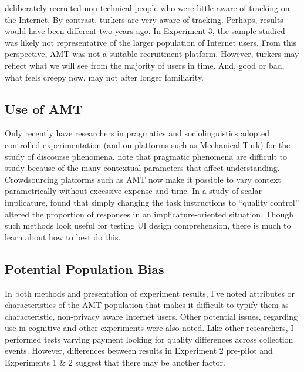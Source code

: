  \citet{Ur:2012ws}  deliberately recruited non-technical people who were little aware of tracking on the Internet. By contrast, turkers are very aware of tracking. Perhaps, results would have been different two years ago. In Experiment 3, the sample studied was likely not representative of the larger population of Internet users. From this perspective, AMT was not a suitable recruitment platform. However, turkers may reflect what we will see from the majority of users in time. And, good or bad, what feels creepy now, may not after longer familiarity.

\subsection{Use of AMT}
\label{useofamt}

Only recently have researchers in pragmatics and sociolinguistics adopted controlled experimentation (and on platforms such as Mechanical Turk) for the study of discourse phenomena.  \citet{Assessingthepragma:2011ug}  note that pragmatic phenomena are difficult to study because of the many contextual parameters that affect understanding. Crowdsourcing platforms such as AMT now make it possible to vary context parametrically without excessive expense and time. In a study of scalar implicature,  \citet{Assessingthepragma:2011ug}  found that simply changing the task instructions to ``quality control'' altered the proportion of responses in an implicature-oriented situation. Though such methods look useful for testing UI design comprehension, there is much to learn about how to best do this.

\subsection{Potential Population Bias}
\label{potentialpopulationbias}

In both methods and presentation of experiment results, I've noted attributes or characteristics of the AMT population that makes it difficult to typify them as characteristic, non-privacy aware Internet users. Other potential issues, regarding use in cognitive and other experiments were also noted. Like other researchers, I performed tests varying payment looking for quality differences across collection events. However, differences between results in Experiment 2 pre-pilot and Experiments 1 \& 2 suggest that there may be another factor.

